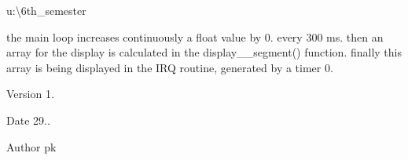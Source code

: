 u\+:\textbackslash{}6th\+\_\+semester

the main loop increases continuously a float value by 0. every 300 ms. then an array for the display is calculated in the display\+\_\+\_\+segment() function. finally this array is being displayed in the I\+R\+Q routine, generated by a timer 0. 



 \begin{DoxyVersion}{Version}
1. 
\end{DoxyVersion}
\begin{DoxyDate}{Date}
29.. 
\end{DoxyDate}
\begin{DoxyAuthor}{Author}
pk 
\end{DoxyAuthor}
